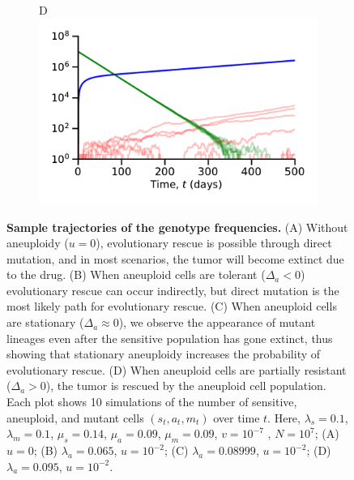 \documentclass[12pt]{extarticle}
\begin{document}
\begin{figure}
\begin{subfigure}{0.5\textwidth}
\end{subfigure}
\begin{subfigure}{0.5\textwidth}
D\\
\includegraphics[width=1\textwidth]{Figures/TauLeapMeanTimeDiagramlargeda.pdf}
\end{subfigure}
\caption{
\textbf{Sample trajectories of the genotype frequencies.}
(A) Without aneuploidy ($u=0$), evolutionary rescue is possible through direct mutation, and in most scenarios, the tumor will become extinct due to the drug. (B) When aneuploid cells are tolerant ($\Delta_a<0$) evolutionary rescue can occur indirectly, but direct mutation is the most likely path for evolutionary rescue. %
(C) When aneuploid cells are stationary ($\Delta_a\approx0$), we observe the appearance of mutant lineages even after the sensitive population has gone extinct, thus showing that stationary aneuploidy increases the probability of evolutionary rescue. (D) When aneuploid cells are partially resistant ($\Delta_a>0$), the tumor is rescued by the aneuploid cell population. Each plot shows 10 simulations of the number of sensitive, aneuploid, and mutant cells $\left(s_t,a_t,m_t\right)$ over time $t$.
Here, $\lambda_s=0.1$, $\lambda_m=0.1$, $\mu_s=0.14$, $\mu_a=0.09$, $\mu_m=0.09$, $v=10^{-7}$ , $N=10^7$; (A) $u=0$; (B) $\lambda_a=0.065$, $u=10^{-2}$; (C) $\lambda_a=0.08999$, $u=10^{-2}$; (D) $\lambda_a=0.095$, $u=10^{-2}$.
}
\label{sampleTrajectories}
\end{figure}

\end{document}
